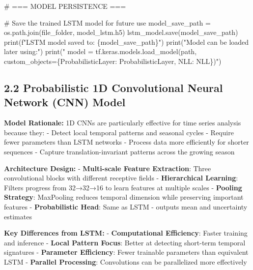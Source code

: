 \documentclass[
  letterpaper,
  DIV=11,
  numbers=noendperiod]{scrreprt}
\newenvironment{Shaded}{\begin{snugshade}}{\end{snugshade}}
\newcommand{\BuiltInTok}[1]{\textcolor[rgb]{0.00,0.23,0.31}{#1}}
\newcommand{\CommentTok}[1]{\textcolor[rgb]{0.37,0.37,0.37}{#1}}
\newcommand{\NormalTok}[1]{\textcolor[rgb]{0.00,0.23,0.31}{#1}}
\newcommand{\OperatorTok}[1]{\textcolor[rgb]{0.37,0.37,0.37}{#1}}
\newcommand{\SpecialCharTok}[1]{\textcolor[rgb]{0.37,0.37,0.37}{#1}}
\newcommand{\SpecialStringTok}[1]{\textcolor[rgb]{0.13,0.47,0.30}{#1}}
\newcommand{\StringTok}[1]{\textcolor[rgb]{0.13,0.47,0.30}{#1}}
\begin{document}
\begin{Shaded}
\begin{Highlighting}[]
\CommentTok{\# === MODEL PERSISTENCE ===}

\CommentTok{\# Save the trained LSTM model for future use}
\NormalTok{model\_save\_path }\OperatorTok{=}\NormalTok{ os.path.join(file\_folder, }\StringTok{\textquotesingle{}model\_lstm.h5\textquotesingle{}}\NormalTok{)}
\NormalTok{lstm\_model.save(model\_save\_path)}
\BuiltInTok{print}\NormalTok{(}\SpecialStringTok{f"LSTM model saved to: }\SpecialCharTok{\{}\NormalTok{model\_save\_path}\SpecialCharTok{\}}\SpecialStringTok{"}\NormalTok{)}
\BuiltInTok{print}\NormalTok{(}\StringTok{"Model can be loaded later using:"}\NormalTok{)}
\BuiltInTok{print}\NormalTok{(}\StringTok{"  model = tf.keras.models.load\_model(path, custom\_objects=\{\textquotesingle{}ProbabilisticLayer\textquotesingle{}: ProbabilisticLayer, \textquotesingle{}NLL\textquotesingle{}: NLL\})"}\NormalTok{)}
\end{Highlighting}
\end{Shaded}

\subsection{2.2 Probabilistic 1D Convolutional Neural Network (CNN)
Model}\label{probabilistic-1d-convolutional-neural-network-cnn-model}

\textbf{Model Rationale:} 1D CNNs are particularly effective for time
series analysis because they: - Detect local temporal patterns and
seasonal cycles - Require fewer parameters than LSTM networks - Process
data more efficiently for shorter sequences - Capture
translation-invariant patterns across the growing season

\textbf{Architecture Design:} - \textbf{Multi-scale Feature Extraction}:
Three convolutional blocks with different receptive fields -
\textbf{Hierarchical Learning}: Filters progress from 32→32→16 to learn
features at multiple scales - \textbf{Pooling Strategy}: MaxPooling
reduces temporal dimension while preserving important features -
\textbf{Probabilistic Head}: Same as LSTM - outputs mean and uncertainty
estimates

\textbf{Key Differences from LSTM:} - \textbf{Computational Efficiency}:
Faster training and inference - \textbf{Local Pattern Focus}: Better at
detecting short-term temporal signatures - \textbf{Parameter
Efficiency}: Fewer trainable parameters than equivalent LSTM -
\textbf{Parallel Processing}: Convolutions can be parallelized more
effectively
\end{document}
